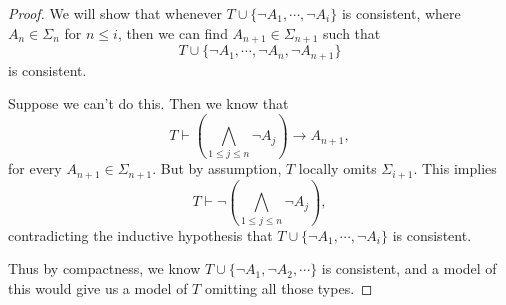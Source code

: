\documentclass[a4paper]{article}
\begin{document}
\begin{proof}
  We will show that whenever $T \cup \{\neg A_1, \cdots, \neg A_i\}$ is consistent, where $A_n \in \Sigma_n$ for $n \leq i$, then we can find $A_{n + 1} \in \Sigma_{n + 1}$ such that
  \[
    T \cup \{\neg A_1, \cdots, \neg A_n, \neg A_{n + 1}\}
  \]
  is consistent.

  Suppose we can't do this. Then we know that
  \[
    T \vdash \left(\bigwedge_{1 \leq j \leq n} \neg A_j \right) \to A_{n + 1},
  \]
  for every $A_{n + 1} \in \Sigma_{n + 1}$. But by assumption, $T$ locally omits $\Sigma_{i + 1}$. This implies
  \[
    T \vdash \neg \left(\bigwedge_{1 \leq j \leq n} \neg A_j \right),
  \]
  contradicting the inductive hypothesis that $T \cup \{\neg A_1, \cdots, \neg A_i\}$ is consistent.

  Thus by compactness, we know $T \cup \{\neg A_1, \neg A_2, \cdots\}$ is consistent, and a model of this would give us a model of $T$ omitting all those types.
\end{proof}
\end{document}
